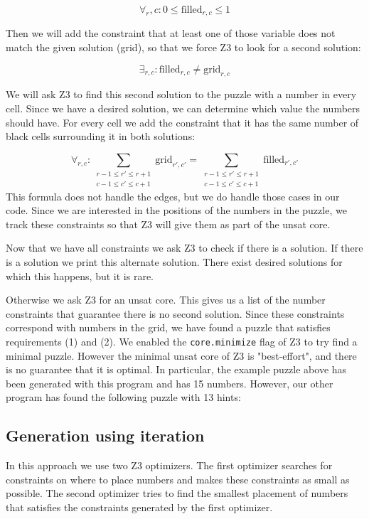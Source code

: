 \documentclass{scrartcl}
\begin{document}
	$$\forall_r,c:  0 \le \text{filled}_{r,c} \le 1$$

	Then we will add the constraint that at least one of those variable does not match the given solution (grid), so that we force Z3 to look for a second solution:

	$$\exists_{r,c}:  \text{filled}_{r,c} \ne \text{grid}_{r,c}$$

	We will ask Z3 to find this second solution to the puzzle with a number in every cell. Since we have a desired solution, we can determine which value the numbers should have. For every cell we add the constraint that it has the same number of black cells surrounding it in both solutions:

	$$\forall_{r,c}: \sum_{\substack{r-1\le r' \le r+1\\c-1\le c'\le c+1}}\text{grid}_{r',c'} = \sum_{\substack{r-1\le r' \le r+1\\c-1\le c'\le c+1}}\text{filled}_{r',c'}$$
	This formula does not handle the edges, but we do handle those cases in our code. Since we are interested in the positions of the numbers in the puzzle, we track these constraints so that Z3 will give them as part of the unsat core.

	Now that we have all constraints we ask Z3 to check if there is a solution.
	If there is a solution we print this alternate solution.
	There exist desired solutions for which this happens, but it is rare.

	Otherwise we ask Z3 for an unsat core. This gives us a list of the number constraints that guarantee there is no second solution. Since these constraints correspond with numbers in the grid, we have found a puzzle that satisfies requirements (1) and (2). We enabled the \texttt{core.minimize} flag of Z3 to try find a minimal puzzle. However the minimal unsat core of Z3 is "best-effort", and there is no guarantee that it is optimal. In particular, the example puzzle above has been generated with this program and has 15 numbers. However, our other program has found the following puzzle with 13 hints:

	\begin{figure}[H]
		\centering
		
	\end{figure}

	\subsection{Generation using iteration} %
	\label{sub:mosaic_iteration}
	In this approach we use two Z3 optimizers.
	The first optimizer searches for constraints on where to place numbers and makes these constraints as small as possible.
	The second optimizer tries to find the smallest placement of numbers that satisfies the constraints generated by the first optimizer.\\
\end{document}

